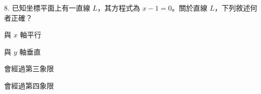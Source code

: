 \documentclass[12pt]{article}
\begin{document}
\begin{problem}
  \item[8.] 已知坐標平面上有一直線 $L$，其方程式為 $x - 1 = 0$。關於直線 $L$，下列敘述何者正確？
  \begin{choices}
    \item 與 $x$ 軸平行
    \item 與 $y$ 軸垂直
    \item 會經過第三象限
    \item 會經過第四象限
  \end{choices}
\end{problem}
\end{document}
